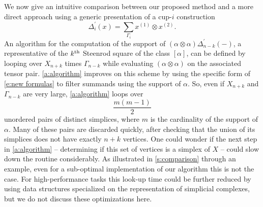 We now give an intuitive comparison between our proposed method  and a more direct approach using a generic presentation of a cup-$i$ construction
\[
\Delta^\prime_i(x) =
\sum_{\Gamma_i} x^{(1)} \otimes x^{(2)}.
\]
An algorithm for the computation of the support of $(\alpha \otimes \alpha)\Delta^\prime_{n-k}(-)$, a representative of the $k^{\mathrm{th}}$ Steenrod square of the class $[\alpha]$, can be defined by looping over $X_{n+k}$ times $\Gamma_{n-k}$ while evaluating $(\alpha \otimes \alpha)$ on the associated tensor pair.
\cref{a:algorithm} improves on this scheme by using the specific form of \eqref{e:new formulas} to filter summands using the support of $\alpha$.
So, even if $X_{n+k}$ and $\Gamma_{n-k}$ are very large, \cref{a:algorithm} loops over
\[
\frac{m(m-1)}{2}
\]
unordered pairs of distinct simplices, where $m$ is the cardinality of the support of $\alpha$.
Many of these pairs are discarded quickly, after checking that the union of its simplices does not have exactly $n+k$ vertices.
One could wonder if the next step in \cref{a:algorithm} -- determining if this set of vertices is a simplex of $X$ -- could slow down the routine considerably.
As illustrated in \cref{s:comparison} through an example, even for a sub-optimal implementation of our algorithm this is not the case.
For high-performance tasks this look-up time could be further reduced by using data structures specialized on the representation of simplicial complexes, but we do not discuss these optimizations here.